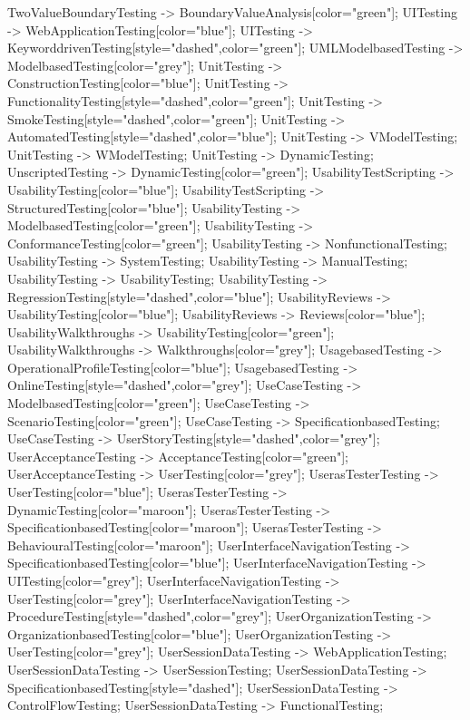 \documentclass{article}
\begin{document}
{TwoValueBoundaryTesting -> BoundaryValueAnalysis[color="green"];
UITesting -> WebApplicationTesting[color="blue"];
UITesting -> KeyworddrivenTesting[style="dashed",color="green"];
UMLModelbasedTesting -> ModelbasedTesting[color="grey"];
UnitTesting -> ConstructionTesting[color="blue"];
UnitTesting -> FunctionalityTesting[style="dashed",color="green"];
UnitTesting -> SmokeTesting[style="dashed",color="green"];
UnitTesting -> AutomatedTesting[style="dashed",color="blue"];
UnitTesting -> VModelTesting;
UnitTesting -> WModelTesting;
UnitTesting -> DynamicTesting;
UnscriptedTesting -> DynamicTesting[color="green"];
UsabilityTestScripting -> UsabilityTesting[color="blue"];
UsabilityTestScripting -> StructuredTesting[color="blue"];
UsabilityTesting -> ModelbasedTesting[color="green"];
UsabilityTesting -> ConformanceTesting[color="green"];
UsabilityTesting -> NonfunctionalTesting;
UsabilityTesting -> SystemTesting;
UsabilityTesting -> ManualTesting;
UsabilityTesting -> UsabilityTesting;
UsabilityTesting -> RegressionTesting[style="dashed",color="blue"];
UsabilityReviews -> UsabilityTesting[color="blue"];
UsabilityReviews -> Reviews[color="blue"];
UsabilityWalkthroughs -> UsabilityTesting[color="green"];
UsabilityWalkthroughs -> Walkthroughs[color="grey"];
UsagebasedTesting -> OperationalProfileTesting[color="blue"];
UsagebasedTesting -> OnlineTesting[style="dashed",color="grey"];
UseCaseTesting -> ModelbasedTesting[color="green"];
UseCaseTesting -> ScenarioTesting[color="green"];
UseCaseTesting -> SpecificationbasedTesting;
UseCaseTesting -> UserStoryTesting[style="dashed",color="grey"];
UserAcceptanceTesting -> AcceptanceTesting[color="green"];
UserAcceptanceTesting -> UserTesting[color="grey"];
UserasTesterTesting -> UserTesting[color="blue"];
UserasTesterTesting -> DynamicTesting[color="maroon"];
UserasTesterTesting -> SpecificationbasedTesting[color="maroon"];
UserasTesterTesting -> BehaviouralTesting[color="maroon"];
UserInterfaceNavigationTesting -> SpecificationbasedTesting[color="blue"];
UserInterfaceNavigationTesting -> UITesting[color="grey"];
UserInterfaceNavigationTesting -> UserTesting[color="grey"];
UserInterfaceNavigationTesting -> ProcedureTesting[style="dashed",color="grey"];
UserOrganizationTesting -> OrganizationbasedTesting[color="blue"];
UserOrganizationTesting -> UserTesting[color="grey"];
UserSessionDataTesting -> WebApplicationTesting;
UserSessionDataTesting -> UserSessionTesting;
UserSessionDataTesting -> SpecificationbasedTesting[style="dashed"];
UserSessionDataTesting -> ControlFlowTesting;
UserSessionDataTesting -> FunctionalTesting;
}
\end{document}
